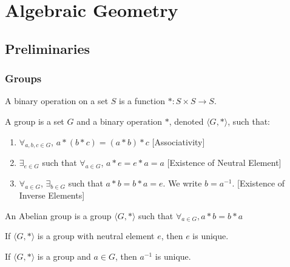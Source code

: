 \documentclass[crop=false,class=article,oneside]{standalone}
\begin{document}
    \ifx\ifsub\undefined
        \section*{Algebraic Geometry}
        \setcounter{section}{1}
    \fi
    \subsection{Preliminaries}
        \subsubsection{Groups}
            \begin{definition}
                A binary operation on a set $S$ is a
                function $*:S\times S \rightarrow S$.
            \end{definition}
            \begin{definition}
                A group is a set $G$ and a binary operation $*$,
                denoted $\langle G,*\rangle$, such that:
                \begin{enumerate}
                    \item $\forall_{a,b,c\in G}$, $a*(b*c)=(a*b)*c$
                          \hfill[Associativity]
                    \item $\exists_{e\in G}$ such that
                          $\forall_{a\in G}$, $a*e=e*a=a$
                          \hfill[Existence of Neutral Element]
                    \item $\forall_{a\in G}$, $\exists_{b\in G}$
                          such that $a*b=b*a=e$.
                          We write $b=a^{-1}$.
                          \hfill[Existence of Inverse Elements]
                \end{enumerate}
            \end{definition}
            \begin{definition}
                An Abelian group is a group $\langle G,*\rangle$
                such that $\forall_{a\in G},a*b=b*a$
            \end{definition}
            \begin{theorem}
                If $\langle G, *\rangle$ is a group with neutral
                element $e$, then $e$ is unique.
            \end{theorem}
            \begin{theorem}
                If $\langle G,*\rangle$ is a group and $a\in G$,
                then $a^{-1}$ is unique.
            \end{theorem}
\end{document}
